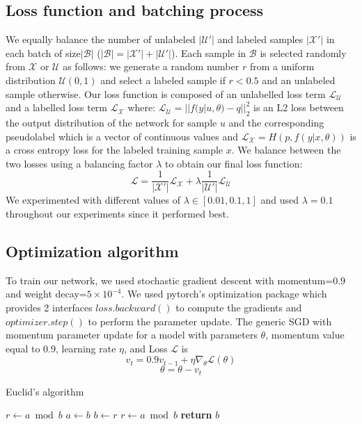 \documentclass{article}
\begin{document}
\subsection{Loss function and batching process}
We equally balance the number of unlabeled $|\mathcal{U}'|$ and labeled samples $|\mathcal{X}'|$ in each batch of size$|\mathcal{B}|$ ($|\mathcal{B}| = |\mathcal{X'}| + |\mathcal{U'}|$). Each sample in $\mathcal{B}$ is selected randomly from $\mathcal{X}$ or $\mathcal{U}$ as follows: we generate a random number $r$ from a uniform distribution $\mathcal{U}(0, 1)$ and select a labeled sample if $r<0.5$ and an unlabeled sample otherwise.
\newline
Our loss function is composed of an unlabelled loss term $\mathcal{L}_{\mathcal{U}}$ and a labelled loss term $\mathcal{L}_{\mathcal{X}}$ where:
$\mathcal{L}_{\mathcal{U}} = ||f(y | u, \theta) -  q||_{2}^{2}$
is an L2 loss between the output distribution of the network for sample $u$ and the corresponding pseudolabel which is a vector of continuous values and $\mathcal{L}_{\mathcal{X}} = H(p, f(y | x, \theta))$ is a cross entropy loss for the labeled training sample $x$. 
\newline 
We balance between the two losses using a balancing factor $\lambda$ to obtain our final loss function:
$$\mathcal{L} = \frac{1}{|\mathcal{X}'|} \mathcal{L}_{\mathcal{X}} + \lambda\frac{1}{|\mathcal{U}'|} \mathcal{L}_{\mathcal{U}}$$ We experimented with different values of $\lambda \in [0.01, 0.1, 1]$ and used $\lambda=0.1$ throughout our experiments since it performed best.
\subsection{Optimization algorithm}
To train our network, we used stochastic gradient descent with momentum=0.9 and weight decay=$5\times10^{-4}$. We used pytorch's optimization package which provides 2 interfaces $loss.backward()$ to compute the gradients and $optimizer.step()$ to perform the parameter update. The generic SGD with momentum parameter update for a model with parameters $\theta$, momentum value equal to 0.9, learning rate $\eta$,  and Loss $\mathcal{L}$ is
$$ 
 v_{t} = 0.9 v_{t-1} + \eta \nabla_{\theta} \mathcal{L}(\theta) 
$$
$$
\theta = \theta - v_{t}
$$
\begin{algorithm}
\caption{Euclid’s algorithm}\label{euclid}
\begin{algorithmic}[1]
\State $r\gets a\bmod b$
\State $a\gets b$
\State $b\gets r$
\State $r\gets a\bmod b$
\EndWhile\label{euclidendwhile}
\State \textbf{return} $b$
\EndProcedure
\end{algorithmic}
\end{algorithm}
\end{document}
